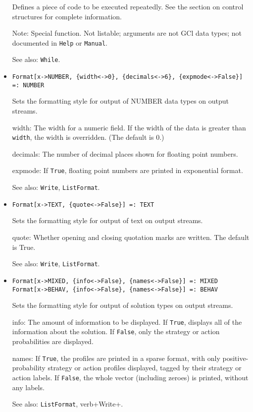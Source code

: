 \begin{itemize}
\bd
Defines a piece of code to be executed repeatedly.  See the section
on control structures for complete information.
\item [Note:] Special function.  Not listable; arguments are not GCl
data types; not documented in \verb+Help+ or \verb+Manual+.  
\item
[See also:] \verb+While+.
\ed

\item{}
\protect \large \begin{verbatim}
Format[x->NUMBER, {width<->0}, {decimals<->6}, {expmode<->False}] =: NUMBER 
\end{verbatim} \normalsize

\bd
Sets the formatting style for output of NUMBER data types on output streams.
\bd
\item [width:] The width for a numeric field.  If the width of the
data is greater than \verb+width+, the width is overridden.  (The
default is 0.)
\item [decimals:] The number of decimal places shown for floating point
numbers.
\item [expmode:] If \verb+True+, floating point numbers are printed in
exponential format.
\ed
\item [See also:] \verb+Write+, \verb+ListFormat+.
\ed

\item{}
\protect \large \begin{verbatim}
Format[x->TEXT, {quote<->False}] =: TEXT 
\end{verbatim} \normalsize

\bd
Sets the formatting style for output of text on output streams.
\bd
\item [quote:] Whether opening and closing quotation marks are
written.  The default is True.  
\ed
\item [See also:] \verb+Write+, \verb+ListFormat+.
\ed


\item{}
\protect \large \begin{verbatim}
Format[x->MIXED, {info<->False}, {names<->False}] =: MIXED
Format[x->BEHAV, {info<->False}, {names<->False}] =: BEHAV
\end{verbatim} \normalsize

\bd
Sets the formatting style for output of solution types on output streams.
\bd
\item [info:] The amount of information to be displayed.  If \verb+True+,
displays all of the information about the solution.  If \verb+False+,
only the strategy or action probabilities are displayed.
\item [names:] If \verb+True+, the profiles are printed in a sparse format,
with only positive-probability strategy or action profiles displayed, tagged
by their strategy or action labels.  If \verb+False+, the whole vector
(including zeroes) is printed, without any labels.
\ed
\item [See also:] \verb+ListFormat+, verb+Write+.
\ed


\end{itemize}

